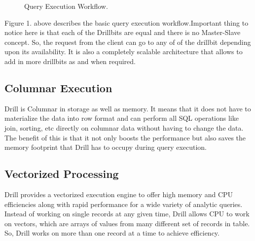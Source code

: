 \documentclass[9pt,twocolumn,twoside]{../../styles/osajnl}
\begin{document}
	\begin{figure}[htbp]
		\centering
		\caption{Query Execution Workflow.}
		\label{fig:Drill-arch}
	\end{figure}
	
	Figure 1. above describes the basic query execution workflow.Important thing to notice here is that each of the Drillbits are equal and there is no Master-Slave concept. So, the request from the client can go to any of of the drillbit depending upon its availability. It is also a completely scalable architecture that allows to add in more drillbits as and when
	required\cite{Query-Execution}.

\subsection{Columnar Execution}
	Drill is Columnar in storage as well as memory. It means that it does not have
	to materialize the data into row format and can perform all SQL operations like
	join, sorting, etc directly on columnar data  without having to change the data.
	The benefit of this is that it not only boosts the performance but also saves
	the memory footprint that Drill has to occupy during query execution.

\subsection{Vectorized Processing}
	Drill  provides a vectorized execution engine to offer high memory and CPU
	efficiencies along with rapid performance for a wide variety of analytic
	queries. Instead of working on single records at any given time, Drill allows
	CPU to work on vectors, which are arrays of values from many different set of
	records in table. So, Drill works on more than one record at a time to achieve
	efficiency.
\end{document}
